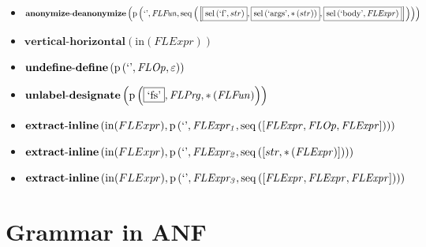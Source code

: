 {\begin{itemize}
\item $\mathbf{anonymize\text{-}deanonymize}\\\left(\mathrm{p}\left(\text{`'},\mathit{FLFun},\mathrm{seq}\left(\left[\fbox{$\mathrm{sel}\left(\text{`f'},str\right)$}, \fbox{$\mathrm{sel}\left(\text{`args'},{*}\left(str\right)\right)$}, \fbox{$\mathrm{sel}\left(\text{`body'},\mathit{FLExpr}\right)$}\right]\right)\right)\right)$
\item $\mathbf{vertical\text{-}horizontal}\left(\mathrm{in}(FLExpr)\right)$
\item $\mathbf{undefine\text{-}define}\\\left(\mathrm{p}\left(\text{`'},\mathit{FLOp},\varepsilon\right)\right)$
\item $\mathbf{unlabel\text{-}designate}\\\left(\mathrm{p}\left(\fbox{\text{`fs'}},\mathit{FLPrg},{*}\left(\mathit{FLFun}\right)\right)\right)$
\item $\mathbf{extract\text{-}inline}\left(\mathrm{in}(FLExpr),\\\mathrm{p}\left(\text{`'},\mathit{FLExpr_1},\mathrm{seq}\left(\left[\mathit{FLExpr}, \mathit{FLOp}, \mathit{FLExpr}\right]\right)\right)\right)$
\item $\mathbf{extract\text{-}inline}\left(\mathrm{in}(FLExpr),\\\mathrm{p}\left(\text{`'},\mathit{FLExpr_2},\mathrm{seq}\left(\left[str, {*}\left(\mathit{FLExpr}\right)\right]\right)\right)\right)$
\item $\mathbf{extract\text{-}inline}\left(\mathrm{in}(FLExpr),\\\mathrm{p}\left(\text{`'},\mathit{FLExpr_3},\mathrm{seq}\left(\left[\mathit{FLExpr}, \mathit{FLExpr}, \mathit{FLExpr}\right]\right)\right)\right)$
\end{itemize}}

\section{Grammar in ANF}

